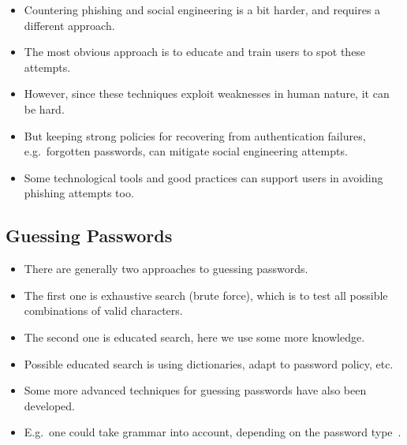 \documentclass{beamer}
\begin{document}
\begin{frame}
  \begin{itemize}
    \item Countering phishing and social engineering is a bit harder, and 
      requires a different approach.

    \item The most obvious approach is to educate and train users to spot these 
      attempts.

    \item However, since these techniques exploit weaknesses in human nature, 
      it can be hard.

    \item But keeping strong policies for recovering from authentication 
      failures, e.g.\ forgotten passwords, can mitigate social engineering 
      attempts.

    \item Some technological tools and good practices can support users in 
      avoiding phishing attempts too.
  \end{itemize}
\end{frame}

\subsection{Guessing Passwords}

\begin{frame}
  \begin{itemize}
    \item There are generally two approaches to guessing passwords.

    \item The first one is exhaustive search (brute force), which is to test 
      all possible combinations of valid characters.

    \item The second one is educated search, here we use some more knowledge.
  \end{itemize}
\end{frame}

\begin{frame}
  \begin{itemize}
    \item Possible educated search is using dictionaries, adapt to password 
      policy, etc.

    \item Some more advanced techniques for guessing passwords have also been 
      developed.

    \item E.g.\ one could take grammar into account, depending on the password 
      type~\cite{Bonneau2012ghs,Bonneau2012lpo}.
  \end{itemize}
\end{frame}
\end{document}
